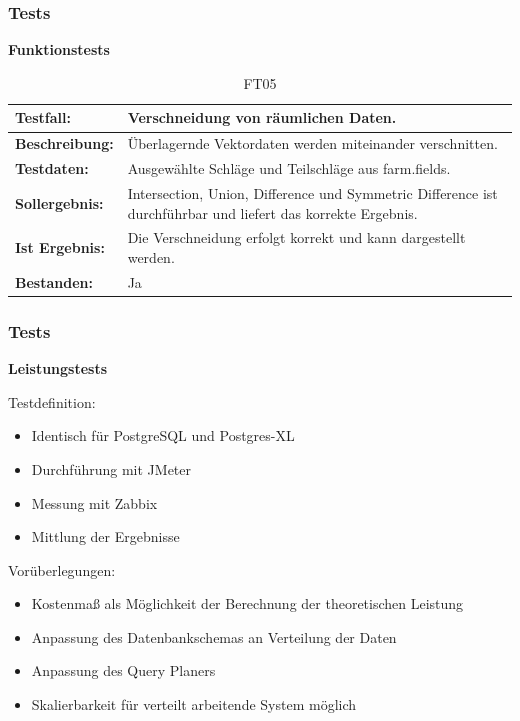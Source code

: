 \documentclass{beamer}
\begin{document}
\begin{frame}\frametitle{Tests}
\centering\textbf{Funktionstests}

\begin{table}[h!]
\centering
\small
\begin{tabular}{|p{2.3cm}|p{7cm}|}
 \hline
\textbf{Testfall:} & Verschneidung von räumlichen Daten. \\ \hline
\textbf{Beschreibung:} & Überlagernde Vektordaten werden miteinander verschnitten. \\ \hline
\textbf{Testdaten:} & Ausgewählte Schläge und Teilschläge aus farm.fields. \\ \hline
\textbf{Sollergebnis:} & Intersection, Union, Difference und Symmetric Difference ist durchführbar und liefert das korrekte Ergebnis. \\ \hline
\textbf{Ist Ergebnis:} & Die Verschneidung erfolgt korrekt und kann dargestellt werden. \\ \hline
\textbf{Bestanden:} & Ja \\ \hline
\end{tabular}
\caption{FT05}
\end{table}
\end{frame}

\begin{frame}\frametitle{Tests}
\centering\textbf{Leistungstests}

\begin{block}{Testdefinition:}
\begin{itemize}
\item Identisch für PostgreSQL und Postgres-XL
\item Durchführung mit JMeter
\item Messung mit Zabbix
\item Mittlung der Ergebnisse %
\end{itemize}
\end{block}

\begin{block}{Vorüberlegungen:}
\begin{itemize}
\item Kostenmaß als Möglichkeit der Berechnung der theoretischen Leistung
\item Anpassung des Datenbankschemas an Verteilung der Daten
\item Anpassung des Query Planers
\item Skalierbarkeit für verteilt arbeitende System möglich
\end{itemize}
\end{block}
\end{frame}
\end{document}

